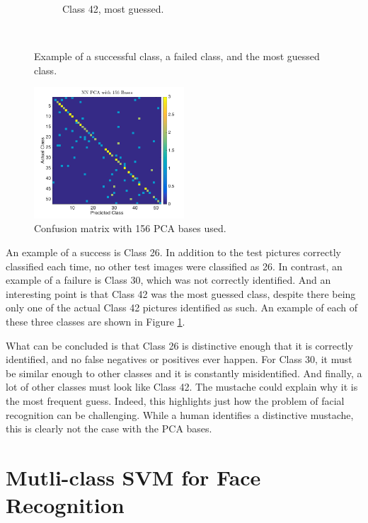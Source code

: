 \documentclass[a4paper, 10pt, conference]{ieeeconf}
\begin{document}
\begin{figure}[!ht]
\begin{subfigure}{0.125\textwidth}
          \caption{Class 42, most guessed.}
        \end{subfigure}
        ~
	\caption{Example of a successful class, a failed class, and the most guessed class. }
  \label{fig:classpics}
\end{figure}

\begin{figure}[!ht]
    \centering
    \includegraphics[width=0.5\textwidth]{src/confusepca.png}
    \caption{Confusion matrix with 156 PCA bases used.}
    \label{fig:confusepca}
\end{figure}

An example of a success is Class 26. In addition to the test pictures correctly classified each time, no other test images were classified as 26. In contrast, an example of a failure is Class 30, which was not correctly identified. And an interesting point is that Class 42 was the most guessed class, despite there being only one of the actual Class 42 pictures identified as such. An example of each of these three classes are shown in Figure \ref{fig:classpics}.

What can be concluded is that Class 26 is distinctive enough that it is correctly identified, and no false negatives or positives ever happen. For Class 30, it must be similar enough to other classes and it is constantly misidentified. And finally, a lot of other classes must look like Class 42. The mustache could explain why it is the most frequent guess. Indeed, this highlights just how the problem of facial recognition can be challenging. While a human identifies a distinctive mustache, this is clearly not the case with the PCA bases.

\section{Mutli-class SVM for Face Recognition}

\end{document}
